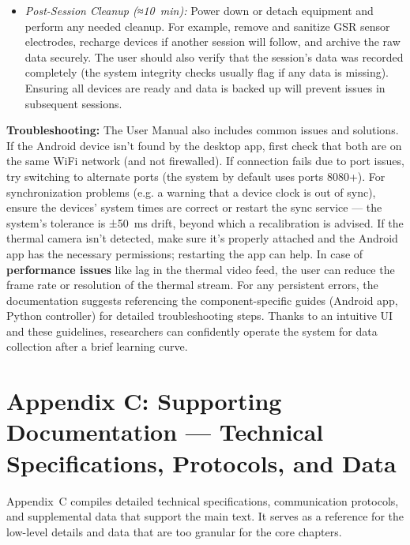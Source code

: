 \begin{itemize}
\item \textit{Post-Session Cleanup (≈10 min):} Power down or detach equipment and
  perform any needed cleanup. For example, remove and sanitize GSR
  sensor electrodes, recharge devices if another session will follow,
  and archive the raw data securely. The user should also verify that
  the session's data was recorded completely (the system integrity
  checks usually flag if any data is missing). Ensuring all devices are
  ready and data is backed up will prevent issues in subsequent
  sessions.

\end{itemize}
\textbf{Troubleshooting:} The User Manual also includes common issues and
solutions. If the Android device isn't found by the desktop app, first
check that both are on the same WiFi network (and not
firewalled)\cite{ref24}.
If connection fails due to port issues, try switching to alternate ports
(the system by default uses ports 8080+). For synchronization problems
(e.g. a warning that a device clock is out of sync), ensure the devices'
system times are correct or restart the sync service --- the system's
tolerance is ±50 ms drift, beyond which a recalibration is
advised\cite{ref25}.
If the thermal camera isn't detected, make sure it's properly attached
and the Android app has the necessary permissions; restarting the app
can
help\cite{ref26}.
In case of \textbf{performance issues} like lag in the thermal video feed,
the user can reduce the frame rate or resolution of the thermal
stream\cite{ref27}.
For any persistent errors, the documentation suggests referencing the
component-specific guides (Android app, Python controller) for detailed
troubleshooting
steps\cite{ref28}.
Thanks to an intuitive UI and these guidelines, researchers can
confidently operate the system for data collection after a brief
learning curve.

\section{Appendix C: Supporting Documentation --- Technical Specifications, Protocols, and Data}

Appendix C compiles detailed technical specifications, communication
protocols, and supplemental data that support the main text. It serves
as a reference for the low-level details and data that are too granular
for the core chapters.

